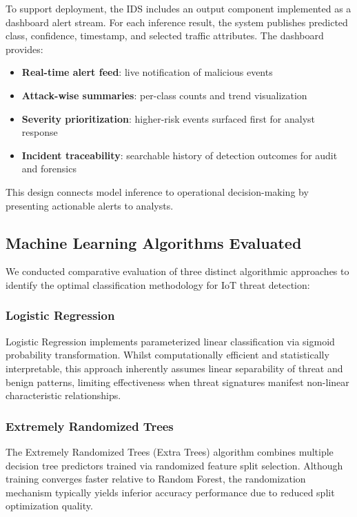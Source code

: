 \documentclass[conference]{IEEEtran}
\begin{document}
To support deployment, the IDS includes an output component implemented as a dashboard alert stream. For each inference result, the system publishes predicted class, confidence, timestamp, and selected traffic attributes. The dashboard provides:

\begin{itemize}
\item \textbf{Real-time alert feed}: live notification of malicious events
\item \textbf{Attack-wise summaries}: per-class counts and trend visualization
\item \textbf{Severity prioritization}: higher-risk events surfaced first for analyst response
\item \textbf{Incident traceability}: searchable history of detection outcomes for audit and forensics
\end{itemize}

This design connects model inference to operational decision-making by presenting actionable alerts to analysts.

\subsection{Machine Learning Algorithms Evaluated}

We conducted comparative evaluation of three distinct algorithmic approaches to identify the optimal classification methodology for IoT threat detection:

\subsubsection{Logistic Regression}

Logistic Regression implements parameterized linear classification via sigmoid probability transformation. Whilst computationally efficient and statistically interpretable, this approach inherently assumes linear separability of threat and benign patterns, limiting effectiveness when threat signatures manifest non-linear characteristic relationships.

\subsubsection{Extremely Randomized Trees}

The Extremely Randomized Trees (Extra Trees) algorithm combines multiple decision tree predictors trained via randomized feature split selection. Although training converges faster relative to Random Forest, the randomization mechanism typically yields inferior accuracy performance due to reduced split optimization quality.
\end{document}
